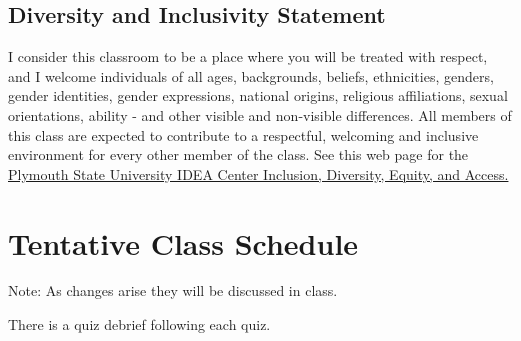 \documentclass[letterpaper]{inzane_syllabus} %
\begin{document}
\subsection{Diversity and Inclusivity Statement}

I consider this classroom to be a place where you will be treated with respect, and I welcome individuals of all ages, backgrounds, beliefs, ethnicities, genders, gender identities, gender expressions, national origins, religious affiliations, sexual orientations, ability - and other visible and non-visible differences. All members of this class are expected to contribute to a respectful, welcoming and inclusive environment for every other member of the class. See this web page for the \href{https://www.plymouth.edu/idea-center}{Plymouth State University IDEA Center
Inclusion, Diversity, Equity, and Access.}

\bigskip
\bigskip
\section{Tentative Class Schedule}

Note: As changes arise they will be discussed in class.

There is a quiz debrief following each quiz. 
\end{document}
